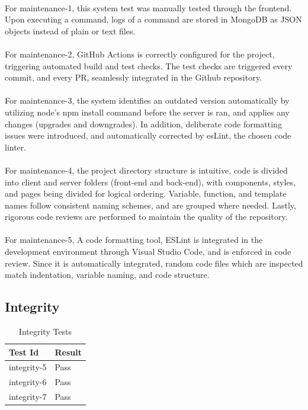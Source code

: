 \documentclass[12pt, titlepage]{article}
\begin{document}
\\
For maintenance-1, this system test was manually tested through the frontend. Upon executing a command, logs of a command are stored in MongoDB as JSON objects instead of plain or text files.
\\ \\
For maintenance-2, GitHub Actions is correctly configured for the project, triggering automated build and test checks. The test checks are triggered every commit, and every PR, seamlessly integrated in the Github repository.
\\ \\
For maintenance-3, the system identifies an outdated version automatically by utilizing node’s npm install command before the server is ran, and applies any changes (upgrades and downgrades). In addition, deliberate code formatting issues were introduced, and automatically corrected by esLint, the chosen code linter.
\\ \\
For maintenance-4, the project directory structure is intuitive, code is divided into client and server folders (front-end and back-end), with components, styles, and pages being divided for logical ordering. Variable, function, and template names follow consistent naming schemes, and are grouped where needed. Lastly, rigorous code reviews are performed to maintain the quality of the repository.
\\ \\
For maintenance-5, A code formatting tool, ESLint is integrated in the development environment through Visual Studio Code, and is enforced in code review. Since it is automatically integrated, random code files which are inspected match indentation, variable naming, and code structure.


\subsection{Integrity}

\begin{center}
\begin{longtable}{|p{4cm} | p{4cm}| }
\caption{Integrity Tests}
\hline
\textbf{Test Id} & \textbf{Result} \\
\hline
integrity-5 & Pass \\
\hline
integrity-6 & Pass \\
\hline
integrity-7 & Pass \\
\hline

\end{longtable}
\end{center}
\end{document}
